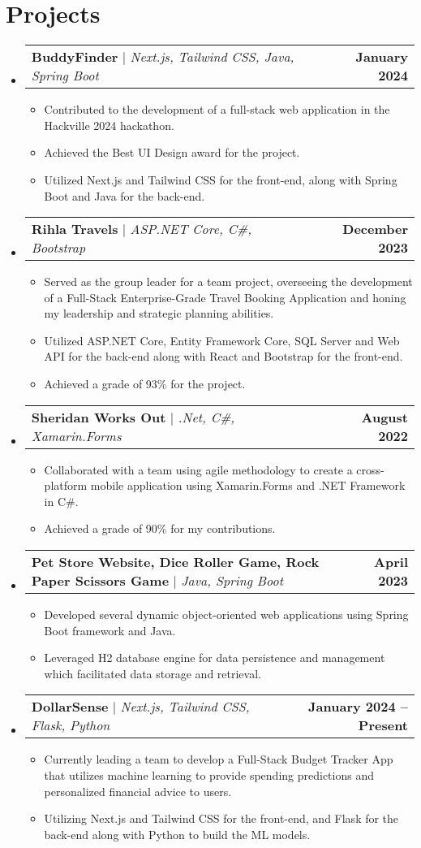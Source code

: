 \documentclass[a4,11pt]{article}
\makeatletter
\newcommand{\resumeItem}[1]{
  \item\small{
    {#1 \vspace{-2pt}}
  }
}
\newcommand{\resumeProjectHeading}[2]{
    \item
    \begin{tabular*}{1.001\textwidth}{l@{\extracolsep{\fill}}r}
      \small#1 & \textbf{\small #2}\\
    \end{tabular*}\vspace{-7pt}
}
\newcommand{\resumeSubHeadingListStart}{\begin{itemize}[leftmargin=0.0in, label={}]}
\newcommand{\resumeSubHeadingListEnd}{\end{itemize}}
\newcommand{\resumeItemListStart}{\begin{itemize}}
\newcommand{\resumeItemListEnd}{\end{itemize}\vspace{-5pt}}
\makeatother
\begin{document}
\section{Projects}
    \vspace{-5pt}
    \resumeSubHeadingListStart
      \resumeProjectHeading
          {\textbf{BuddyFinder} $|$ \emph{Next.js, Tailwind CSS, Java, Spring Boot}}{January 2024}
          \resumeItemListStart
            \resumeItem{Contributed to the development of a full-stack web application in the Hackville 2024 hackathon.}
            \resumeItem{Achieved the Best UI Design award for the project.}
            \resumeItem{Utilized Next.js and Tailwind CSS for the front-end, along with Spring Boot and Java for the back-end.}
          \resumeItemListEnd
          \vspace{-13pt}
      \resumeProjectHeading
          {\textbf{Rihla Travels} $|$ \emph{ASP.NET Core, C\#, Bootstrap}}{December 2023}
          \resumeItemListStart
            \resumeItem{Served as the group leader for a team project, overseeing the development of a Full-Stack Enterprise-Grade Travel Booking Application and honing my leadership and strategic planning abilities.}
            \resumeItem{Utilized ASP.NET Core, Entity Framework Core, SQL Server and Web API for the back-end along with React and Bootstrap for the front-end.}
            \resumeItem{Achieved a grade of 93\% for the project.}
          \resumeItemListEnd
          \vspace{-13pt}
      \resumeProjectHeading
          {\textbf{Sheridan Works Out} $|$ \emph{.Net, C\#, Xamarin.Forms}}{August 2022}
          \resumeItemListStart
            \resumeItem{Collaborated with a team using agile methodology to create a cross-platform mobile application using Xamarin.Forms and .NET Framework in C\#.}
            \resumeItem{Achieved a grade of 90\% for my contributions.}
          \resumeItemListEnd
          \vspace{-13pt}
      \resumeProjectHeading
          {\textbf{Pet Store Website, Dice Roller Game, Rock Paper Scissors Game} $|$ \emph{Java, Spring Boot}}{April 2023}
          \resumeItemListStart
            \resumeItem{Developed several dynamic object-oriented web applications using Spring Boot framework and Java.}
            \resumeItem{Leveraged H2 database engine for data persistence and management which facilitated data storage and retrieval.}
          \resumeItemListEnd
          \vspace{-13pt}
      \resumeProjectHeading
          {\textbf{DollarSense} $|$ \emph{Next.js, Tailwind CSS, Flask, Python}}{January 2024 -- Present}
          \resumeItemListStart
            \resumeItem{Currently leading a team to develop a Full-Stack Budget Tracker App that utilizes machine learning to provide spending predictions and personalized financial advice to users.}
            \resumeItem{Utilizing Next.js and Tailwind CSS for the front-end, and Flask for the back-end along with Python to build the ML models.}
          \resumeItemListEnd
    \resumeSubHeadingListEnd
\vspace{-16pt}
\end{document}
